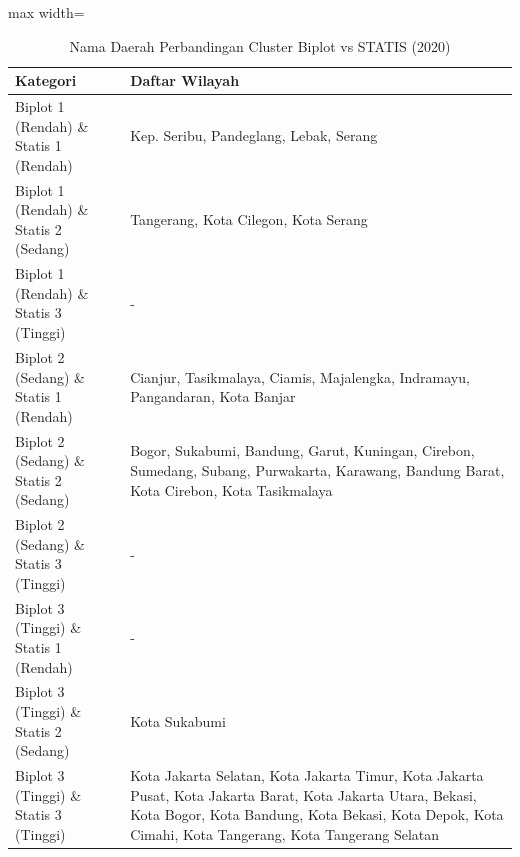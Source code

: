 \begin{table}[H]
\centering
\caption{Nama Daerah Perbandingan Cluster Biplot vs STATIS (2020)} \label{tab:appbiplot_statis_comp_name_2020}
\begin{adjustbox}{max width=\textwidth}
\begin{tabular}{|p{4cm}|p{10cm}|}
\hline
\textbf{Kategori} & \textbf{Daftar Wilayah} \\
\hline
Biplot 1 (Rendah) \& Statis 1 (Rendah) & Kep. Seribu, Pandeglang, Lebak, Serang \\
\hline
Biplot 1 (Rendah) \& Statis 2 (Sedang) & Tangerang, Kota Cilegon, Kota Serang \\
\hline
Biplot 1 (Rendah) \& Statis 3 (Tinggi) & - \\
\hline
Biplot 2 (Sedang) \& Statis 1 (Rendah) & Cianjur, Tasikmalaya, Ciamis, Majalengka, Indramayu, Pangandaran, Kota Banjar \\
\hline
Biplot 2 (Sedang) \& Statis 2 (Sedang) & Bogor, Sukabumi, Bandung, Garut, Kuningan, Cirebon, Sumedang, Subang, Purwakarta, Karawang, Bandung Barat, Kota Cirebon, Kota Tasikmalaya \\
\hline
Biplot 2 (Sedang) \& Statis 3 (Tinggi) & - \\
\hline
Biplot 3 (Tinggi) \& Statis 1 (Rendah) & - \\
\hline
Biplot 3 (Tinggi) \& Statis 2 (Sedang) & Kota Sukabumi \\
\hline
Biplot 3 (Tinggi) \& Statis 3 (Tinggi) & Kota Jakarta Selatan, Kota Jakarta Timur, Kota Jakarta Pusat, Kota Jakarta Barat, Kota Jakarta Utara, Bekasi, Kota Bogor, Kota Bandung, Kota Bekasi, Kota Depok, Kota Cimahi, Kota Tangerang, Kota Tangerang Selatan \\
\hline
\end{tabular}
\end{adjustbox}
\end{table}